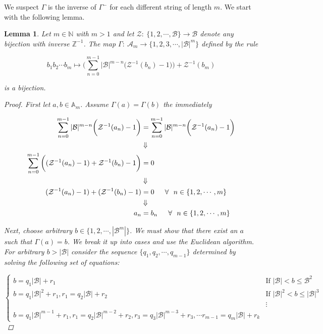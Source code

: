 \documentclass[amsmath,12pt,a4paper]{amsart}
\newtheorem{lemma}{Lemma}
\begin{document}
  We suspect $\Gamma$ is the inverse of $\Gamma^-$ for each different string of length $m$. We start with the following lemma.

\begin{lemma}\label{lem1}
Let $m\in \mathbb{N}$ with $m>1$ and let $\mathcal{Z}:~ \{1,2,\cdots, \mathcal{B}\}\rightarrow \mathcal{B}$ denote any bijection with inverse $\mathbb{Z}^{-1}$. The map $\Gamma:~\mathcal{A}_m\rightarrow \{1,2,3,\cdots, |\mathcal{B}|^m\}$ defined by the rule 

\begin{equation}\label{Eq34}
b_1b_2 \cdots b_m \mapsto \biggl(\sum_{n=0}^{m-1}{|\mathcal{B}|^{m-n}\biggl(\mathcal{Z}^{-1}(b_n)-1\biggr)}\biggr)+ \mathcal{Z}^{-1}(b_m)
\end{equation}

is a bijection. 

\begin{proof}
First let $a,b\in \mathbb{A}_m$. Assume $\Gamma(a) = \Gamma(b)$ the immediately

\begin{equation}\label{Eq35}
\begin{split}
\sum_{n=0}^{m-1}{|\mathcal{B}|^{m-n}\biggl(\mathcal{Z}^{-1}(a_n)-1\biggr)} & = \sum_{n=0}^{m-1}{|\mathcal{B}|^{m-n}\biggl(\mathcal{Z}^{-1}(a_n)-1\biggr)}\\
& \Downarrow\\
\sum_{n=0}^{m-1}{\biggl((\mathcal{Z}^{-1}(a_n)-1)+ \mathcal{Z}^{-1}(b_n)-1\biggr)} & = 0\\
& \Downarrow\\
(\mathcal{Z}^{-1}(a_n)-1)+(\mathcal{Z}^{-1}(b_n)-1) & = 0  \indent \forall~~n\in \{1,2,\cdots,m\}\\
&\Downarrow\\
a_n & = b_n \indent \forall~~n\in \{1,2,\cdots,m\}
\end{split}
\end{equation}

Next, choose arbitrary $b\in \{1,2,\cdots, |\mathcal{B}^m|\}$. We must show that there exist an $a$ such that $\Gamma(a) = b$. We break it up into cases and use the Euclidean algorithm. For arbitrary $b>|\mathcal{B}|$ consider the sequence $\{q_1,q_2,\cdots, q_{m-1}\}$ determined by solving the following set of equations: 


\begin{equation}\label{Eq36}
\begin{cases}
b = q_1 |\mathcal{B}|+r_1& \text{If $|\mathcal{B}|<b\le \mathcal{B}^2$}\\
b= q_1|\mathcal{B}|^2+r_1, r_1 = q_2|\mathcal{B}|+r_2 & \text{If $|\mathcal{B}|^2<b\le |\mathcal{B}|^3$}\\
& \vdots\\
b = q_1|\mathcal{B}|^{m-1}+r_1, r_1 = q_2|\mathcal{B}|^{m-2}+r_2, r_3 = q_3|\mathcal{B}|^{m-3}+r_3, \cdots r_{m-1} = q_m|\mathcal{B}|+r_k
\end{cases}
\end{equation}


\end{proof}
\end{lemma}
\end{document}
